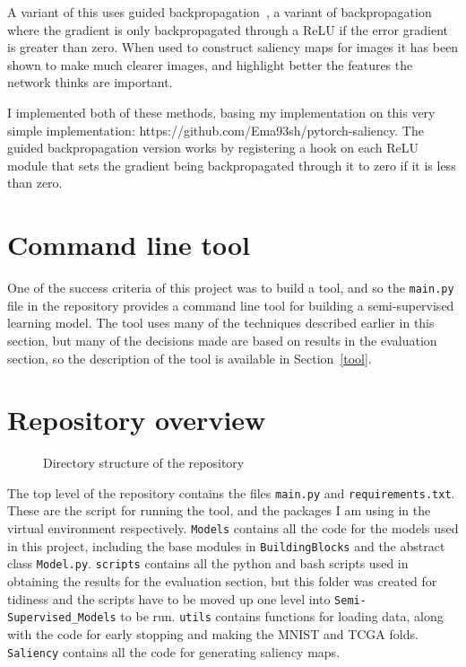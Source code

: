 A variant of this uses guided backpropagation~\cite{DBLP:journals/corr/SpringenbergDBR14}, a variant of backpropagation where the 
gradient is only backpropagated through a ReLU if the error gradient is greater than zero. When used to construct saliency maps for 
images it has been shown to make much clearer images, and highlight better the features the network thinks are important.

I implemented both of these methods, basing my implementation on this very simple implementation: https://github.com/Ema93sh/pytorch-saliency.
The guided backpropagation version works by registering a hook on each ReLU module that sets the gradient being backpropagated through it 
to zero if it is less than zero.

\section{Command line tool}
One of the success criteria of this project was to build a tool, and so the \texttt{main.py} file in the repository provides a command line tool 
for building a semi-supervised learning model. The tool uses many of the techniques described earlier in this section, but many of the 
decisions made are based on results in the evaluation section, so the description of the tool is available in Section~\ref{tool}.

\section{Repository overview}

\begin{figure}[H]
    \centering
    \begin{minipage}{7cm}
    \end{minipage}
    \caption{Directory structure of the repository}
\end{figure}

The top level of the repository contains the files \texttt{main.py} and \texttt{requirements.txt}. These are the script for running the tool,
and the packages I am using in the virtual environment respectively. \texttt{Models} contains all the code for the models used in this project,
including the base modules in \texttt{BuildingBlocks} and the abstract class \texttt{Model.py}.
\texttt{scripts} contains all the python and bash scripts used in 
obtaining the results for the evaluation section, but this folder was created for tidiness and the scripts have to be moved up one level into 
\texttt{Semi-Supervised\_Models} to be run. \texttt{utils} contains functions for loading data, along with the code for early stopping and 
making the MNIST and TCGA folds. \texttt{Saliency} contains all the code for generating saliency maps.